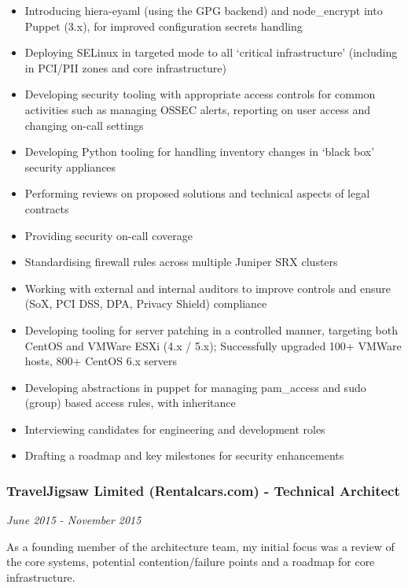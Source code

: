 \begin{itemize}
\itemsep1pt\parskip0pt
\item
  Introducing hiera-eyaml (using the GPG backend) and node\_encrypt into
  Puppet (3.x), for improved configuration secrets handling
\item
  Deploying SELinux in targeted mode to all `critical infrastructure'
  (including in PCI/PII zones and core infrastructure)
\item
  Developing security tooling with appropriate access controls for
  common activities such as managing OSSEC alerts, reporting on user
  access and changing on-call settings
\item
  Developing Python tooling for handling inventory changes in `black
  box' security appliances
\item
  Performing reviews on proposed solutions and technical aspects of
  legal contracts
\item
  Providing security on-call coverage
\item
  Standardising firewall rules across multiple Juniper SRX clusters
\item
  Working with external and internal auditors to improve controls and
  ensure (SoX, PCI DSS, DPA, Privacy Shield) compliance
\item
  Developing tooling for server patching in a controlled manner,
  targeting both CentOS and VMWare ESXi (4.x / 5.x); Successfully
  upgraded 100+ VMWare hosts, 800+ CentOS 6.x servers
\item
  Developing abstractions in puppet for managing pam\_access and sudo
  (group) based access rules, with inheritance
\item
  Interviewing candidates for engineering and development roles
\item
  Drafting a roadmap and key milestones for security enhancements
\end{itemize}

\subsubsection{TravelJigsaw Limited (Rentalcars.com) - Technical
Architect}\label{traveljigsaw-limited-rentalcars.com---technical-architect}

\emph{June 2015 - November 2015}

As a founding member of the architecture team, my initial focus was a
review of the core systems, potential contention/failure points and a
roadmap for core infrastructure.

